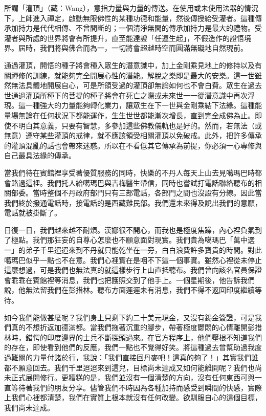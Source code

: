 所謂「灌頂」（藏：Wang），意指力量與力量的傳送。在使用或未使用法器的情況下，上師進入禪定，啟動無限佛性的某種功德和能量，然後傳授給受灌者。這種傳承加持力是代代相傳、不曾間斷的；一個清淨無間的傳承加持力是最大的禮物。受灌者與所處的世界將會有所提升，直至能達證「任運生起」，不假造作的證悟境界。屆時，我們將與佛合而為一，一切將會超越時空而圓滿無礙地自然現前。

通過灌頂，開悟的種子將會種入眾生的潛意識中，加上金剛乘見地上的修持以及有關禪修的訓練，就能夠完全開展心性的潛能。解脫之樂即是最大的安樂。這一世雖然無法具體地開展自心，可是所領受過的灌頂卻無論如何也不會白費。眾生在過去世通過灌頂所種下的菩提的種子將會在死亡之際或未來世一一從潛意識中再次浮現。這一種強大的力量能夠轉化業力，讓眾生在下一世與金剛乘結下法緣。這種能量場無論在任何狀況下都能運作，生生世世都能漸次增長，直到完全成佛為止。即使不明白其意義，只要有智慧，多參加這些佛教儀軌也是好的。然而，若無法（或無意）遵守某些灌頂的戒律，就不應該領受相關灌頂以免破戒。此外，把許多傳承的灌頂混亂的話也會帶來迷惑。所以在不看低其它傳承為前提，你必須一心專修與自己最具法緣的傳承。

當我們待在賓館裡享受著優質服務的同時，快樂的不丹人每天上山去見噶瑪巴時都會路過這裡。我們托人給噶瑪巴與吉梅醫生帶信，同時也嘗試打電話聯絡聽布的相關部委。當時整個不丹政府部門只有三部電話，各部門之間也沒設有分線。因此當我們終於撥通電話時，接電話的是西藏難民部。我們還未來得及說出我們的意願，電話就被掛斷了。

日復一日，我們越來越不耐煩。漢娜很不開心，而我也是極度焦躁，內心裡負氣到了極點。我們那狂妄的自尊心怎麼也不願意面對現實。我們貴為噶瑪巴「萬中選一」的弟子千里迢迢來到不丹就只能乾坐在一旁，白白浪費許多寶貴的時間。對此噶瑪巴似乎一點也不在意。我們心裡實在是咽不下這一個事實。雖然心裡從未停止這麼想過，可是我們也無法真的就這樣步行上山直抵聽布。我們曾向該名官員保證會乖乖在賓館裡等消息，我們也把護照交到了他手上。一個星期後，他告訴我們說，他無法留我們在彭措林。聽布方面遲遲未有消息，我們不得不返回印度繼續等待。

如今我們能做甚麼呢？我們身上只剩下約二十美元現金，又沒有錫金簽證，可是我們真的不想折返加德滿都。當我們拖著沉重的腳步，帶著極度鬱悶的心情離開彭措林時，錯愕的印度邊界的士兵不斷探頭過來。在官方程序上，他們壓根不知道我們的存在，即使看到他們的反應，我們一點也不覺得好笑。將這種過去曾幫助過我度過難關的力量付諸於行，我說：「我們直接回丹麥吧！這真的夠了！」其實我們誰都不願意回去。我們千里迢迢來到這兒，目標尚未達成又如何能離開呢？我們也尚未正式展開修行。更糟糕的是，我們並沒有一個清楚的方向，沒有任何東西可與一直等待著我們的朋友分享。儘管我們不時因為各種加持而感受到瞬間的快感，實際上我們心裡都清楚，我們在實質上根本就沒有任何改變。欲馴服自心的這個目標，我們尚未達成。

